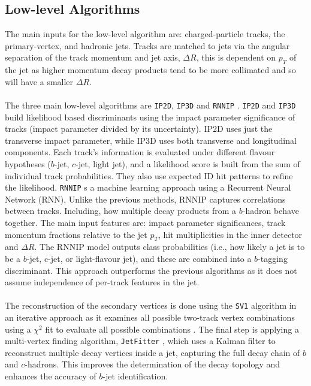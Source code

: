 \subsection{Low-level Algorithms}
The main inputs for the low-level algorithm are: charged-particle tracks, the primary-vertex, and hadronic jets. Tracks are matched to jets via the angular separation of the track momentum and jet axis, $\Delta R$, this is dependent on $p_T$ of the jet as higher momentum decay products tend to be more collimated and so will have a smaller $\Delta R$.
\\
\\
The three main low-level algorithms are \verb|IP2D|, \verb|IP3D| and \verb|RNNIP| \cite{ip23d,RINNP}. \verb|IP2D| and \verb|IP3D| build likelihood based discriminants using the impact parameter significance of tracks (impact parameter divided by its uncertainty). IP2D uses just the transverse impact parameter, while IP3D uses both transverse and longitudinal components. Each track's information is evaluated under different flavour hypotheses ($b$-jet, $c$-jet, light jet), and a likelihood score is built from the sum of individual track probabilities. They also use expected ID hit patterns to refine the likelihood. \verb|RNNIP| s a machine learning approach using a Recurrent Neural Network (RNN), Unlike the previous methods, RNNIP captures correlations between tracks. Including, how multiple decay products from a $b$-hadron behave together. The main input features are:  impact parameter significances, track momentum fractions relative to the jet $p_T$, hit multiplicities in the inner detector and $\Delta R$. The RNNIP model outputs class probabilities (i.e., how likely a jet is to be a $b$-jet, c-jet, or light-flavour jet), and these are combined into a $b$-tagging discriminant. This approach outperforms the previous algorithms as it does not assume independence of per-track features in the jet.
\\
\\
The reconstruction of the secondary vertices is done using the \verb|SV1| algorithm in an iterative approach as it examines all possible two-track vertex combinations using a $\chi^2$ fit to evaluate all possible combinations \cite{SVertex}. The final step is applying a multi-vertex finding algorithm, \verb|JetFitter| \cite{JetFitter}, which uses a Kalman filter to reconstruct multiple decay vertices inside a jet, capturing the full decay chain of $b$ and $c$-hadrons. This improves the determination of the decay topology and enhances the accuracy of $b$-jet identification. 
